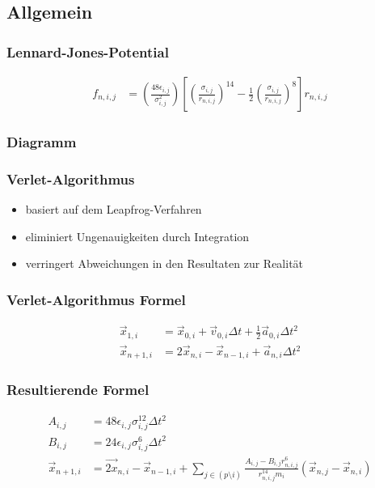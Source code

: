 \documentclass[compress]{beamer}
\begin{document}
\subsection{Allgemein}
\begin{frame}%
	\frametitle{Lennard-Jones-Potential}
    \begin{align*}
	f_{n,i,j}&=\left(\frac{48\epsilon_{i,j}}{\sigma_{i,j}^2}\right)\left[\left(\frac{\sigma_{i,j}}{r_{n,i,j}}\right)^{14}-\frac{1}{2}\left(\frac{\sigma_{i,j}}{r_{n,i,j}}\right)^8\right]r_{n,i,j}
	\end{align*}
\end{frame}
\begin{frame}%
	\frametitle{Diagramm}
    \begin{figure}
		\begin{center}
	    \end{center}
	\end{figure}
\end{frame}
\begin{frame}%
	\frametitle{Verlet-Algorithmus}
	\begin{itemize}
		\item basiert auf dem Leapfrog-Verfahren
		\item eliminiert Ungenauigkeiten durch Integration
		\item verringert Abweichungen in den Resultaten zur Realität 
	\end{itemize}
\end{frame}
\begin{frame}%
	\frametitle{Verlet-Algorithmus Formel}
    \begin{align*}
	\vec{x}_{1,i}&=\vec{x}_{0,i}+\vec{v}_{0,i}\Delta t+\frac{1}{2}\vec{a}_{0,i}\Delta t^2\\
	\vec{x}_{n+1,i}&=2\vec{x}_{n,i}-\vec{x}_{n-1,i}+\vec{a}_{n,i}\Delta t^2
\end{align*}
\end{frame}
\begin{frame}%
	\frametitle{Resultierende Formel}
    \begin{align*}
    A_{i,j}&=48\epsilon_{i,j}\sigma_{i,j}^{12}\Delta t^2\\
	B_{i,j}&=24\epsilon_{i,j}\sigma_{i,j}^{6}\Delta t^2\\
	\vec{x}_{n+1,i}&=\vec{2x}_{n,i}-\vec{x}_{n-1,i}+\sum_{j\in (p\setminus i)}\frac{A_{i,j}-B_{i,j}r_{n,i,j}^6}{r_{n,i,j}^{14}m_i}\left(\vec{x}_{n,j}-\vec{x}_{n,i}\right)
\end{align*}
\end{frame}
\end{document}
